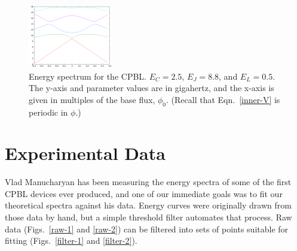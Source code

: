 \documentclass[twocolumn]{revtex4}
\newcommand{\figwidth}{0.33\textwidth}
\begin{document}
\begin{figure}
\includegraphics[width=\figwidth]{CPBL-theory.png}
\caption{ Energy spectrum for the CPBL. $E_C=2.5$, $E_J=8.8$, and
  $E_L=0.5$. The y-axis and parameter values are in gigahertz, and the
  x-axis is given in multiples of the base flux, $\phi_0$. (Recall
  that Eqn.~\ref{inner-V} is periodic in $\phi$.)}
\label{cpbl-theory}
\end{figure}

\section{Experimental Data}
Vlad Manucharyan has been measuring the energy spectra of some of the
first CPBL devices ever produced, and one of our immediate goals was
to fit our theoretical spectra against his data. Energy curves were
originally drawn from those data by hand, but a simple threshold
filter automates that process. Raw data (Figs.~\ref{raw-1} and
\ref{raw-2}) can be filtered into sets of points suitable for fitting
(Figs.~\ref{filter-1} and \ref{filter-2}).
\end{document}
